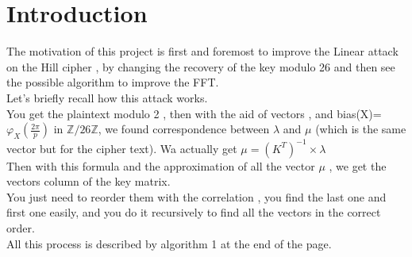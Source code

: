 \documentclass{article}
\begin{document}

\section{Introduction}
	The motivation of this project is first and foremost to improve the Linear attack on the Hill cipher , by changing the recovery of the key modulo 26 and then see the possible algorithm to improve the FFT.\\
Let's briefly recall how this attack works.\\
You get the plaintext modulo 2 , then with the aid of vectors , and bias(X)= $\varphi_{X}(\frac{2\pi}{p})$ in $\mathbb{Z}/26\mathbb{Z}$, we found correspondence between $\lambda$ and $\mu$ (which is the same vector but for the cipher text). Wa actually get $ \mu = (K^T)^{-1} \times\lambda $\\
Then with this formula and the approximation of all the vector $\mu$ , we get the vectors column of the key matrix.\\
You just need to reorder them with the correlation , you find the last one and first one easily, and you do it recursively to find all the vectors in the correct order.\\
All this process is described by algorithm 1 at the end of the page.\\
\end{document}
